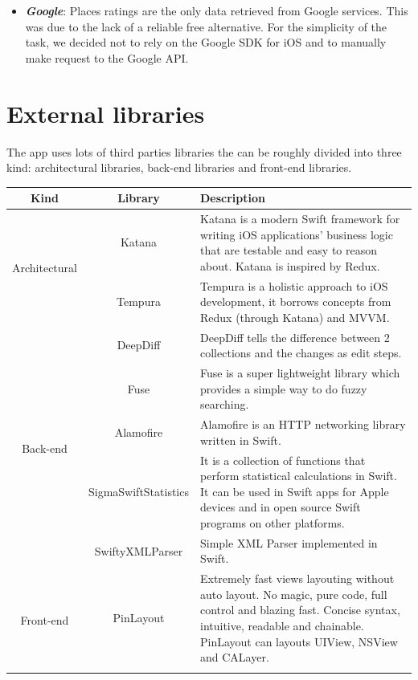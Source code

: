\documentclass[a4paper, 11pt, parskip=half]{scrreprt}
\theoremstyle{definition}
\begin{document}
\begin{itemize}
	\item \textit{\textbf{Google}}: Places ratings are the only data retrieved from Google services. This was due to the lack of a reliable free alternative. For the simplicity of the task, we decided not to rely on the Google SDK for iOS and to manually make request to the Google API.
\end{itemize}

\section{External libraries}

The app uses lots of third parties libraries the can be roughly divided into three kind: architectural libraries, back-end libraries and front-end libraries.

\begin{table}[h]
    \centering
    \def\arraystretch{1.3}
    \begin{tabular}{|c|c|m{9cm}|}
        \hline
        \textbf{Kind} & \textbf{Library} & \textbf{Description} \\ \hline
        \multirow{2}{*}{Architectural} & Katana & Katana is a modern Swift framework for writing iOS applications' business logic that are testable and easy to reason about. Katana is inspired by Redux. \\ \cline{2-3}
        & Tempura & Tempura is a holistic approach to iOS development, it borrows concepts from Redux (through Katana) and MVVM. \\ \hline
        \multirow{5}{*}{Back-end} & DeepDiff & DeepDiff tells the difference between 2 collections and the changes as edit steps. \\ \cline{2-3}
        & Fuse & Fuse is a super lightweight library which provides a simple way to do fuzzy searching. \\ \cline{2-3}
        & Alamofire & Alamofire is an HTTP networking library written in Swift. \\ \cline{2-3}
        & SigmaSwiftStatistics & It is a collection of functions that perform statistical calculations in Swift. It can be used in Swift apps for Apple devices and in open source Swift programs on other platforms. \\ \cline{2-3}
        & SwiftyXMLParser & Simple XML Parser implemented in Swift. \\ \hline
        \multirow{7}{*}{Front-end} & PinLayout & Extremely fast views layouting without auto layout. No magic, pure code, full control and blazing fast. Concise syntax, intuitive, readable and chainable. PinLayout can layouts UIView, NSView and CALayer. \\ \cline{2-3}

\end{tabular}
\end{table}
\end{document}
